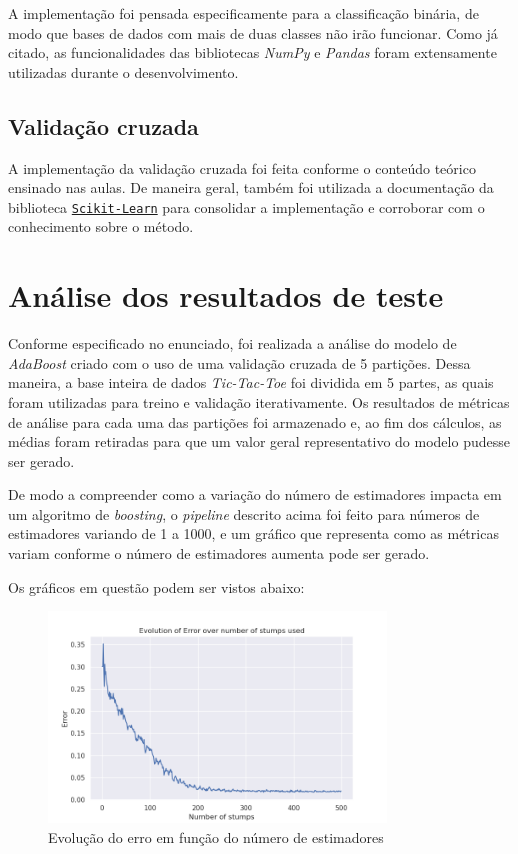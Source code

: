 \documentclass{article}
\begin{document}
A implementação foi pensada especificamente para a classificação binária, de
modo que bases de dados com mais de duas classes não irão funcionar. Como já
citado, as funcionalidades das bibliotecas \textit{NumPy} e \textit{Pandas}
foram extensamente utilizadas durante o desenvolvimento.

\subsection{Validação cruzada}

A implementação da validação cruzada foi feita conforme o conteúdo teórico
ensinado nas aulas. De maneira geral,
também foi utilizada a documentação da biblioteca
\href{https://scikit-learn.org/stable/modules/cross_validation.html}{\texttt{Scikit-Learn}}
para consolidar a implementação e corroborar com o conhecimento sobre o método.

\section{Análise dos resultados de teste}

Conforme especificado no enunciado, foi realizada a análise do modelo de
\textit{AdaBoost} criado com
o uso de uma validação cruzada de 5 partições. Dessa maneira, a base inteira de
dados \textit{Tic-Tac-Toe}
foi dividida em 5 partes, as quais foram utilizadas para treino e validação
iterativamente. Os resultados de métricas
de análise para cada uma das partições foi armazenado e, ao fim dos cálculos,
as médias foram retiradas para que um valor geral representativo
do modelo pudesse ser gerado.

De modo a compreender como a variação do número de estimadores impacta em um
algoritmo de \textit{boosting},
o \textit{pipeline} descrito acima foi feito para números de estimadores
variando de 1 a 1000, e um gráfico que
representa como as métricas variam conforme o número de estimadores aumenta
pode ser gerado.

Os gráficos em questão podem ser vistos abaixo:

\begin{figure}[H]
    \centering
    \includegraphics[width=0.8\textwidth]{images/Error.png}
    \caption{Evolução do erro em função do número de estimadores}
\end{figure}
\end{document}
